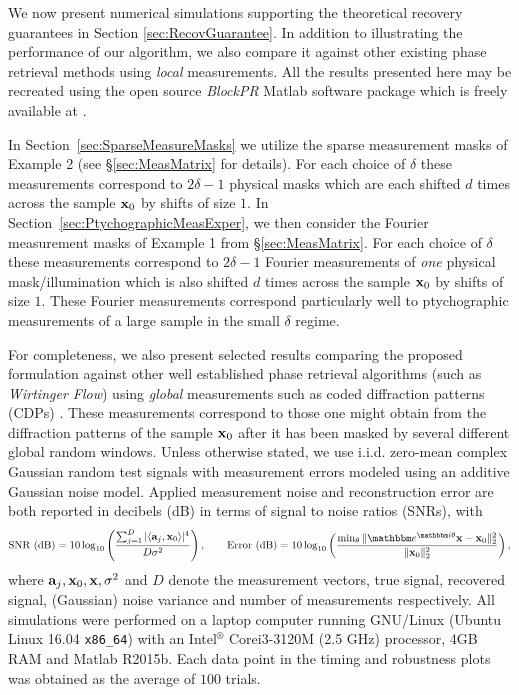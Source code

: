 We now present numerical simulations supporting the theoretical recovery guarantees in Section
\ref{sec:RecovGuarantee}.  In addition to illustrating the performance of our algorithm, we also compare it against other
existing phase retrieval methods using {\em local} measurements. All the results
presented here may be recreated using the open source {\em BlockPR} Matlab software package which is
freely available at \cite{bitbucket_BlockPR}.

In Section~\ref{sec:SparseMeasureMasks} we utilize the sparse measurement masks of Example 2 (see \S \ref{sec:MeasMatrix} for details). For each choice of $\delta$ these measurements correspond to $2\delta - 1$ physical masks which are each shifted $d$ times across the sample $\mathbf x_0$ by shifts of size $1$. In Section~\ref{sec:PtychographicMeasExper}, we then consider the Fourier measurement masks of Example 1 from \S \ref{sec:MeasMatrix}. For each choice of $\delta$ these measurements correspond to $2\delta - 1$ Fourier measurements of {\em one} physical mask/illumination which is also shifted $d$ times across the sample $\mathbf x_0$ by shifts of size $1$. These Fourier measurements correspond particularly well to ptychographic measurements of a large sample in the small $\delta$ regime.

For completeness, we also present selected results comparing the proposed formulation against other
well established phase retrieval algorithms (such as {\em Wirtinger Flow}) using {\em global}
measurements such as coded diffraction patterns (CDPs) \cite[\S 1.5]{Candes2014WF}.  These
measurements correspond to those one might obtain from the diffraction patterns of the sample $\mathbf x_0$
after it has been masked by several different global random windows. Unless otherwise stated, we use
i.i.d.  zero-mean complex Gaussian random test signals with measurement errors modeled using an
additive Gaussian noise model. Applied measurement noise and reconstruction error are both reported
in decibels (dB) in terms of signal to noise ratios (SNRs), with 
%
\[  \mbox{SNR (dB)} = 10 \log_{10} \left( 
        \frac{\sum_{j=1}^D\vert \langle \a_j, \x_0 \rangle \vert ^4}
            {D\sigma^2} \right), \qquad  
    \mbox{Error (dB)} = 10 \log_{10} \left( \frac{\min_\theta \|\ee^{\ii \theta} \x - 
	\x_0 \|_2^2}{\| \x_0 \|^2_2}\right),  \]
%
where $\mathbf a_j, \mathbf x_0, \mathbf x, \sigma^2$ and $D$ denote the measurement vectors, true signal, recovered
signal, (Gaussian) noise variance and number of measurements respectively.  All simulations were
performed on a laptop computer running GNU/Linux (Ubuntu Linux 16.04 \verb|x86_64|) with an
Intel$^\circledR$ Core\texttrademark i3-3120M (2.5 GHz) processor, 4GB RAM and Matlab R2015b. Each
data point in the timing and robustness plots was obtained as the average of $100$ trials.

